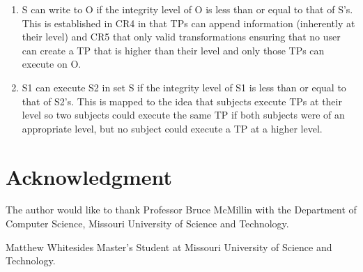 \documentclass[journal,onecolumn]{IEEEtran}
\begin{document}
\begin{enumerate}
\begin{enumerate}
    \item S can write to O if the integrity level of O is less than or equal to that of S's. This is established in CR4 in that TPs can append information (inherently at their level) and CR5 that only valid transformations ensuring that no user can create a TP that is higher than their level and only those TPs can execute on O. 
    \item S1 can execute S2 in set S if the integrity level of S1 is less than or equal to that of S2's. This is mapped to the idea that subjects execute TPs at their level so two subjects could execute the same TP if both subjects were of an appropriate level, but no subject could execute a TP at a higher level.
  \end{enumerate}
\end{enumerate}




\section*{Acknowledgment}
The author would like to thank Professor Bruce McMillin with the Department of Computer Science, Missouri University of Science and Technology.

\ifCLASSOPTIONcaptionsoff
  \newpage
\fi

\begin{IEEEbiographynophoto}{Matthew Whitesides}
  Master's Student at Missouri University of Science and Technology.
\end{IEEEbiographynophoto}

\end{document}
